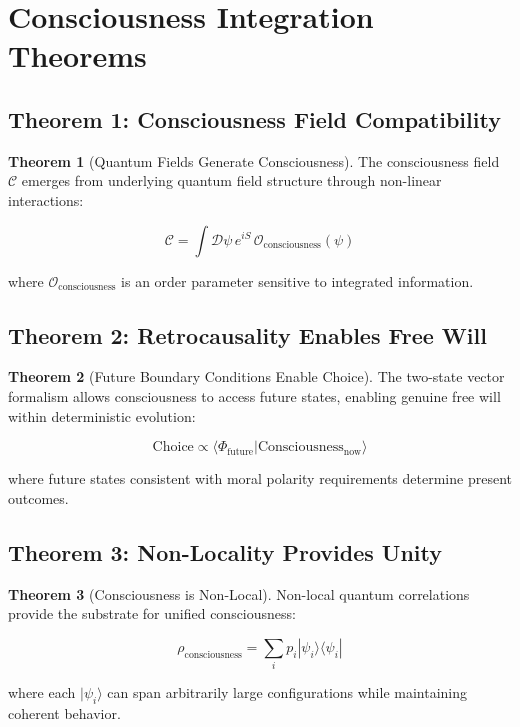 \documentclass[12pt,a4paper]{article}
\theoremstyle{definition}
\newtheorem{theorem}{Theorem}[section]
\begin{document}
\section{Consciousness Integration Theorems}

\subsection{Theorem 1: Consciousness Field Compatibility}

\begin{theorem}[Quantum Fields Generate Consciousness]
The consciousness field $\mathcal{C}$ emerges from underlying quantum field structure through non-linear interactions:

\begin{equation}
\mathcal{C} = \int \mathcal{D}\psi \, e^{iS} \, \mathcal{O}_{\text{consciousness}}(\psi)
\end{equation}

where $\mathcal{O}_{\text{consciousness}}$ is an order parameter sensitive to integrated information.
\end{theorem}

\subsection{Theorem 2: Retrocausality Enables Free Will}

\begin{theorem}[Future Boundary Conditions Enable Choice]
The two-state vector formalism allows consciousness to access future states, enabling genuine free will within deterministic evolution:

\begin{equation}
\text{Choice} \propto \langle \Phi_{\text{future}} | \text{Consciousness}_{\text{now}} \rangle
\end{equation}

where future states consistent with moral polarity requirements determine present outcomes.
\end{theorem}

\subsection{Theorem 3: Non-Locality Provides Unity}

\begin{theorem}[Consciousness is Non-Local]
Non-local quantum correlations provide the substrate for unified consciousness:

\begin{equation}
\rho_{\text{consciousness}} = \sum_i p_i |\psi_i\rangle \langle \psi_i|
\end{equation}

where each $|\psi_i\rangle$ can span arbitrarily large configurations while maintaining coherent behavior.
\end{theorem}
\end{document}
